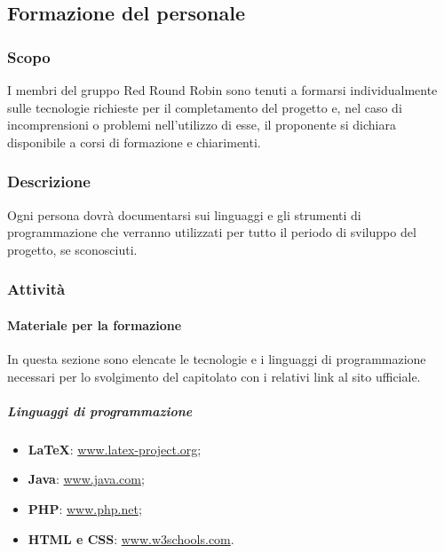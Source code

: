 \subsection{Formazione del personale}

	\subsubsection{Scopo}
		I membri del gruppo Red Round Robin sono tenuti a formarsi individualmente sulle tecnologie richieste per il completamento del progetto e, nel caso di incomprensioni o problemi nell'utilizzo di esse, il proponente si dichiara disponibile a corsi di formazione e chiarimenti.
		
	\subsubsection{Descrizione}
		Ogni persona dovrà documentarsi sui linguaggi e gli strumenti di programmazione che verranno utilizzati per tutto il periodo di sviluppo del progetto, se sconosciuti.
		
	\subsubsection{Attività}

		\paragraph{Materiale per la formazione}
		In questa sezione sono elencate le tecnologie e i linguaggi di programmazione necessari per lo svolgimento del capitolato con i relativi link al sito ufficiale.

		\subparagraph{Linguaggi di programmazione}

		\begin{itemize}
			\item \textbf{\LaTeX{}}: \href{https://www.latex-project.org}{www.latex-project.org};
			\item \textbf{Java}: \href{https://www.java.com/}{www.java.com};
			\item \textbf{PHP}: \href{https://www.php.net/manual/en/}{www.php.net};
			\item \textbf{HTML e CSS}: \href{https://www.w3schools.com/}{www.w3schools.com}.
		\end{itemize}


